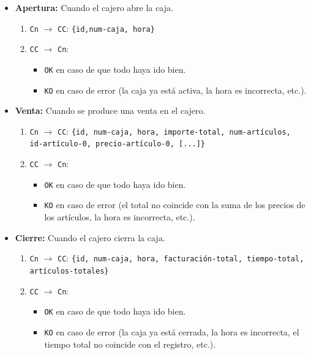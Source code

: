 \begin{itemize}
    \item \textbf{Apertura:} Cuando el cajero abre la caja.
    \begin{enumerate}
        \item \texttt{Cn} $\rightarrow$ \texttt{CC}: \texttt{\{id,num-caja, hora\}}
        \item \texttt{CC} $\rightarrow$ \texttt{Cn}: 
        \begin{itemize}
            \item \texttt{OK} en caso de que todo haya ido bien.
            \item \texttt{KO} en caso de error (la caja ya está activa, la hora es incorrecta, etc.).
        \end{itemize}
    \end{enumerate}

    \item \textbf{Venta:} Cuando se produce una venta en el cajero.
    \begin{enumerate}
        \item \texttt{Cn} $\rightarrow$ \texttt{CC}: \texttt{\{id, num-caja, hora, importe-total, num-artículos,\\
        id-artículo-0, precio-artículo-0, [...]\}}
        \item \texttt{CC} $\rightarrow$ \texttt{Cn}: 
        \begin{itemize}
            \item \texttt{OK} en caso de que todo haya ido bien.
            \item \texttt{KO} en caso de error (el total no coincide con la suma de los precios de los artículos, la hora es incorrecta, etc.).
        \end{itemize}
    \end{enumerate}
    
    \item \textbf{Cierre:} Cuando el cajero cierra la caja.
    \begin{enumerate}
        \item \texttt{Cn} $\rightarrow$ \texttt{CC}: \texttt{\{id, num-caja, hora, facturación-total, tiempo-total,\\
        artículos-totales\}}
        \item \texttt{CC} $\rightarrow$ \texttt{Cn}: 
        \begin{itemize}
            \item \texttt{OK} en caso de que todo haya ido bien.
            \item \texttt{KO} en caso de error (la caja ya está cerrada, la hora es incorrecta, el tiempo total no coincide con el registro, etc.).
        \end{itemize}
    \end{enumerate}
    

\end{itemize}
